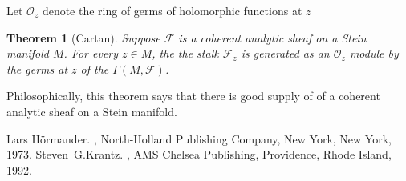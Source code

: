 \documentclass[12pt]{article}
\theoremstyle{theorem}
\newtheorem*{thm}{Theorem}
\theoremstyle{definition}
\theoremstyle{remark}
\begin{document}
Let $\mathcal{O}_z$ denote the ring of germs of
holomorphic functions at $z$

\begin{thm}[Cartan]
Suppose $\mathcal{F}$ is a coherent analytic sheaf on a Stein
manifold $M$.
For every $z \in M$, the the stalk ${\mathcal{F}}_z$
is generated as an ${\mathcal{O}}_z$ module by the germs at $z$
of the  $\Gamma(M,\mathcal{F})$.
\end{thm}

Philosophically, this theorem says that there is good supply of  of a coherent analytic sheaf on a Stein manifold.


\begin{thebibliography}{9}
Lars H\"ormander.
{\em {}},
North-Holland Publishing Company, New York, New York, 1973.
Steven~G.\@ Krantz.
{\em {}},
AMS Chelsea Publishing, Providence, Rhode Island, 1992.
\end{thebibliography}
\end{document}
